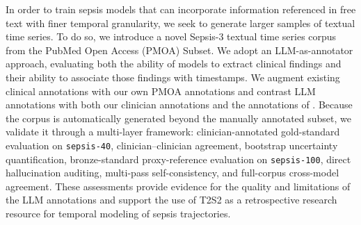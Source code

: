 In order to train sepsis models that can incorporate information referenced in free text with finer temporal granularity, we seek to generate larger samples of textual time series.
To do so, we introduce a novel Sepsis-3 textual time series corpus from the PubMed Open Access (PMOA) Subset.
We adopt an LLM-as-annotator approach, evaluating both the ability of models to extract clinical findings and their ability to associate those findings with timestamps.
We augment existing clinical annotations with our own PMOA annotations and contrast LLM annotations with both our clinician annotations and the annotations of \cite{ch06:frattallone2024using}.
Because the corpus is automatically generated beyond the manually annotated subset, we validate it through a multi-layer framework: clinician-annotated gold-standard evaluation on \texttt{sepsis-40}, clinician--clinician agreement, bootstrap uncertainty quantification, bronze-standard proxy-reference evaluation on \texttt{sepsis-100}, direct hallucination auditing, multi-pass self-consistency, and full-corpus cross-model agreement.
These assessments provide evidence for the quality and limitations of the LLM annotations and support the use of T2S2 as a retrospective research resource for temporal modeling of sepsis trajectories.
